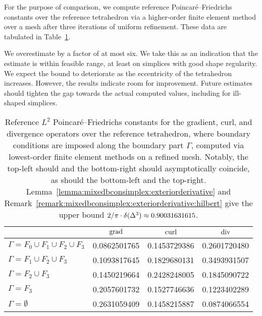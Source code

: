 \documentclass[10pt,a4paper]{article}
\begin{document}
For the purpose of comparison, we compute reference Poincar\'e--Friedrichs constants over the reference tetrahedron via a higher-order finite element method over a mesh after three iterations of uniform refinement.
These data are tabulated in Table~\ref{table:referencepoincarefriedrichs}. 

We overestimate by a factor of at most six.
We take this as an indication that the estimate is within feasible range, at least on simplices with good shape regularity. 
We expect the bound to deteriorate as the eccentricity of the tetrahedron increases.
However, the results indicate room for improvement. 
Future estimates should tighten the gap towards the actual computed values,
including for ill-shaped simplices.

\begin{table}[t]
    \centering
    \begin{tabular}{|l|c|c|c|}
        \hline
                                                  & $\operatorname{grad}$           & $\operatorname{curl}$           & $\operatorname{div}$   \\ \hline
        $\Gamma = F_0 \cup F_1 \cup F_2 \cup F_3$ & 0.0862501765      & 0.1453729386      & 0.2601720480    \\ \hline
        $\Gamma =          F_1 \cup F_2 \cup F_3$ & 0.1093817645      & 0.1829680131      & 0.3493931507    \\ \hline
        $\Gamma =                   F_2 \cup F_3$ & 0.1450219664      & 0.2428248005      & 0.1845090722    \\ \hline
        $\Gamma =                            F_3$ & 0.2057601732      & 0.1527746636      & 0.1223402289    \\ \hline
        $\Gamma =                      \emptyset$ & 0.2631059409      & 0.1458215887      & 0.0874066554    \\ \hline
    \end{tabular}
    \caption{
    Reference $L^2$ Poincar\'e--Friedrichs constants for the gradient, curl, and divergence operators over the reference tetrahedron,
    where boundary conditions are imposed along the boundary part $\Gamma$, 
    computed via lowest-order finite element methods on a refined mesh. 
    Notably, the top-left should and the bottom-right should asymptotically coincide, as should the bottom-left and the top-right.
    Lemma~\ref{lemma:mixedbconsimplex:exteriorderivative} and Remark~\ref{remark:mixedbconsimplex:exteriorderivative:hilbert} 
    give the upper bound $2/\pi \cdot {\delta}(\Delta^3) \approx 0.90031631615$.
    }\label{table:referencepoincarefriedrichs}
\end{table}
    
\end{document}
